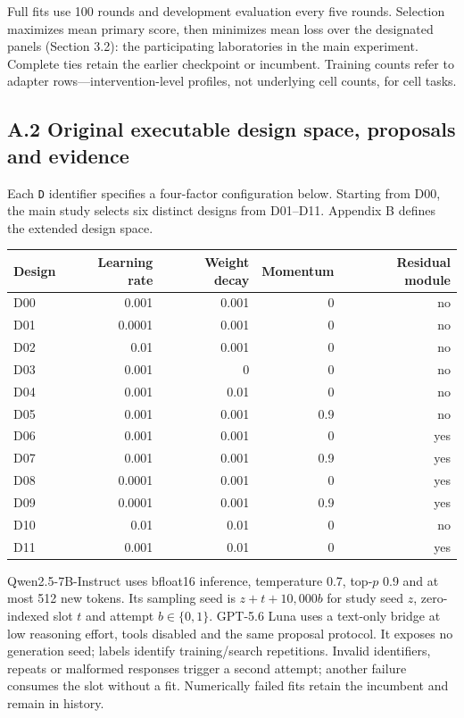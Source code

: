 Full fits use 100 rounds and development evaluation every five rounds. Selection maximizes mean primary score, then minimizes mean loss over the designated panels (Section 3.2): the participating laboratories in the main experiment. Complete ties retain the earlier checkpoint or incumbent. Training counts refer to adapter rows---intervention-level profiles, not underlying cell counts, for cell tasks.

\subsection*{A.2 Original executable design space, proposals and evidence}
Each \texttt{D} identifier specifies a four-factor configuration below. Starting from D00, the main study selects six distinct designs from D01--D11. Appendix B defines the extended design space.

\begin{center}\small
\begin{tabular}{lrrrr}
\toprule
Design & Learning rate & Weight decay & Momentum & Residual module \\
\midrule
D00 & 0.001 & 0.001 & 0 & no \\
D01 & 0.0001 & 0.001 & 0 & no \\
D02 & 0.01 & 0.001 & 0 & no \\
D03 & 0.001 & 0 & 0 & no \\
D04 & 0.001 & 0.01 & 0 & no \\
D05 & 0.001 & 0.001 & 0.9 & no \\
D06 & 0.001 & 0.001 & 0 & yes \\
D07 & 0.001 & 0.001 & 0.9 & yes \\
D08 & 0.0001 & 0.001 & 0 & yes \\
D09 & 0.0001 & 0.001 & 0.9 & yes \\
D10 & 0.01 & 0.01 & 0 & no \\
D11 & 0.001 & 0.01 & 0 & yes \\
\bottomrule
\end{tabular}
\end{center}

Qwen2.5-7B-Instruct uses bfloat16 inference, temperature 0.7, top-$p$ 0.9 and at most 512 new tokens. Its sampling seed is $z+t+10{,}000b$ for study seed $z$, zero-indexed slot $t$ and attempt $b\in\{0,1\}$. GPT-5.6 Luna uses a text-only bridge at low reasoning effort, tools disabled and the same proposal protocol. It exposes no generation seed; labels identify training/search repetitions. Invalid identifiers, repeats or malformed responses trigger a second attempt; another failure consumes the slot without a fit. Numerically failed fits retain the incumbent and remain in history.

